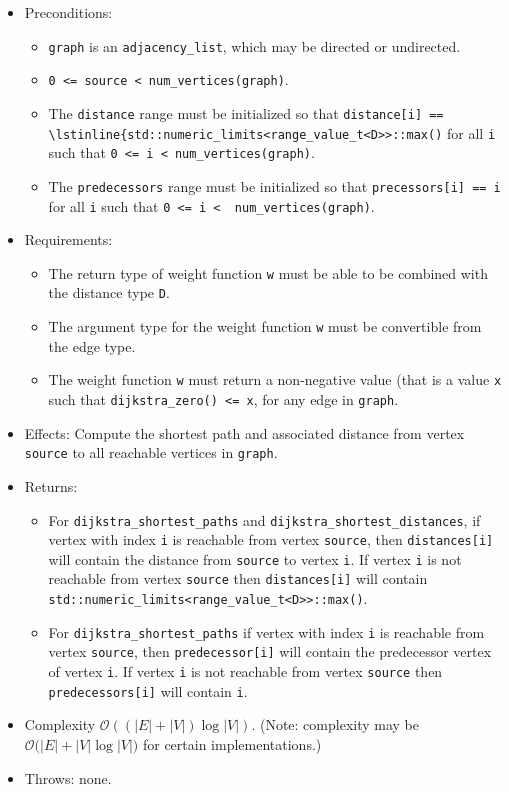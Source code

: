 \begin{itemize}
\item Preconditions:
\begin{itemize}
\item[]
\lstinline{graph} is an \lstinline{adjacency_list}, which may be directed or
undirected.
\item[]
\lstinline{0 <= source < num_vertices(graph)}.
\item[]
  The \lstinline{distance} range must be initialized so that 
    \lstinline{distance[i] == \lstinline{std::numeric_limits<range_value_t<D>>::max()} 
    for all \lstinline{i}
    such that \lstinline{0 <= i < num_vertices(graph)}.  
\item[]
  The \lstinline{predecessors} range must be initialized so that
  \lstinline{precessors[i] == i} for all \lstinline{i} such that 
  \lstinline{0 <= i <  num_vertices(graph)}.
\end{itemize}
\item[] Requirements: 
\begin{itemize}
\item[]
The return type of weight function \lstinline{w} must be able to
  be combined with the distance type \lstinline{D}.  
\item[]
The argument type for the weight
function \lstinline{w} must be convertible from the edge type.
\item[]
  The weight function \lstinline{w} must return a non-negative value (that is
  a value \lstinline{x} such that \lstinline{dijkstra_zero() <= x},
  for any edge in \lstinline{graph}.
\end{itemize}
\item[] 
Effects: Compute the shortest path and associated distance from vertex
\lstinline{source} to all reachable vertices in \lstinline{graph}.
\item[] 
Returns:
\begin{itemize}
\item[] For \lstinline{dijkstra_shortest_paths} and \lstinline{dijkstra_shortest_distances},
  if vertex with index \lstinline{i} is reachable from vertex \lstinline{source}, then
  \lstinline{distances[i]} will contain the distance from \lstinline{source} to vertex
  \lstinline{i}.  If vertex \lstinline{i} is not reachable from vertex
  \lstinline{source} then \lstinline{distances[i]} will contain
  \lstinline{std::numeric_limits<range_value_t<D>>::max()}.
\item[]
For \lstinline{dijkstra_shortest_paths} if vertex with index \lstinline{i} is reachable
from vertex \lstinline{source}, then \lstinline{predecessor[i]} will contain the
predecessor vertex of vertex \lstinline{i}.  If vertex \lstinline{i} is not reachable
from vertex \lstinline{source} then \lstinline{predecessors[i]} will contain
\lstinline{i}.
\end{itemize}
%
\item[] Complexity $\mathcal{O}((|E| + |V|)\log{|V|})$.  (Note: complexity may be
$\mathcal{O}(|E| + |V|\log{|V|)}$ for certain implementations.)
\item[] Throws: none. 
\end{itemize}


